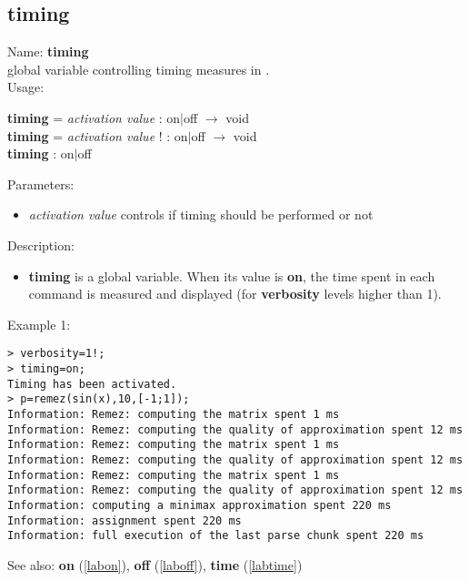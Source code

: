 \subsection{timing}
\label{labtiming}
\noindent Name: \textbf{timing}\\
global variable controlling timing measures in \sollya.\\
\noindent Usage: 
\begin{center}
\textbf{timing} = \emph{activation value} : \textsf{on$|$off} $\rightarrow$ \textsf{void}\\
\textbf{timing} = \emph{activation value} ! : \textsf{on$|$off} $\rightarrow$ \textsf{void}\\
\textbf{timing} : \textsf{on$|$off}\\
\end{center}
Parameters: 
\begin{itemize}
\item \emph{activation value} controls if timing should be performed or not
\end{itemize}
\noindent Description: \begin{itemize}

\item \textbf{timing} is a global variable. When its value is \textbf{on}, the time spent in each 
   command is measured and displayed (for \textbf{verbosity} levels higher than 1).
\end{itemize}
\noindent Example 1: 
\begin{center}\begin{minipage}{15cm}\begin{Verbatim}[frame=single]
> verbosity=1!;
> timing=on;
Timing has been activated.
> p=remez(sin(x),10,[-1;1]);
Information: Remez: computing the matrix spent 1 ms
Information: Remez: computing the quality of approximation spent 12 ms
Information: Remez: computing the matrix spent 1 ms
Information: Remez: computing the quality of approximation spent 12 ms
Information: Remez: computing the matrix spent 1 ms
Information: Remez: computing the quality of approximation spent 12 ms
Information: computing a minimax approximation spent 220 ms
Information: assignment spent 220 ms
Information: full execution of the last parse chunk spent 220 ms
\end{Verbatim}
\end{minipage}\end{center}
See also: \textbf{on} (\ref{labon}), \textbf{off} (\ref{laboff}), \textbf{time} (\ref{labtime})
